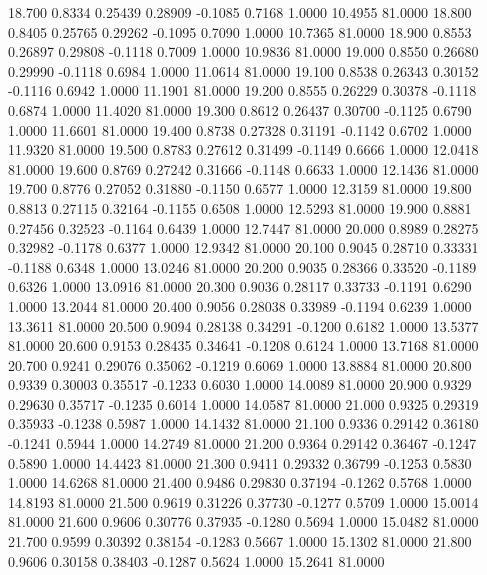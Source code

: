   18.700   0.8334   0.25439   0.28909  -0.1085   0.7168   1.0000  10.4955  81.0000
  18.800   0.8405   0.25765   0.29262  -0.1095   0.7090   1.0000  10.7365  81.0000
  18.900   0.8553   0.26897   0.29808  -0.1118   0.7009   1.0000  10.9836  81.0000
  19.000   0.8550   0.26680   0.29990  -0.1118   0.6984   1.0000  11.0614  81.0000
  19.100   0.8538   0.26343   0.30152  -0.1116   0.6942   1.0000  11.1901  81.0000
  19.200   0.8555   0.26229   0.30378  -0.1118   0.6874   1.0000  11.4020  81.0000
  19.300   0.8612   0.26437   0.30700  -0.1125   0.6790   1.0000  11.6601  81.0000
  19.400   0.8738   0.27328   0.31191  -0.1142   0.6702   1.0000  11.9320  81.0000
  19.500   0.8783   0.27612   0.31499  -0.1149   0.6666   1.0000  12.0418  81.0000
  19.600   0.8769   0.27242   0.31666  -0.1148   0.6633   1.0000  12.1436  81.0000
  19.700   0.8776   0.27052   0.31880  -0.1150   0.6577   1.0000  12.3159  81.0000
  19.800   0.8813   0.27115   0.32164  -0.1155   0.6508   1.0000  12.5293  81.0000
  19.900   0.8881   0.27456   0.32523  -0.1164   0.6439   1.0000  12.7447  81.0000
  20.000   0.8989   0.28275   0.32982  -0.1178   0.6377   1.0000  12.9342  81.0000
  20.100   0.9045   0.28710   0.33331  -0.1188   0.6348   1.0000  13.0246  81.0000
  20.200   0.9035   0.28366   0.33520  -0.1189   0.6326   1.0000  13.0916  81.0000
  20.300   0.9036   0.28117   0.33733  -0.1191   0.6290   1.0000  13.2044  81.0000
  20.400   0.9056   0.28038   0.33989  -0.1194   0.6239   1.0000  13.3611  81.0000
  20.500   0.9094   0.28138   0.34291  -0.1200   0.6182   1.0000  13.5377  81.0000
  20.600   0.9153   0.28435   0.34641  -0.1208   0.6124   1.0000  13.7168  81.0000
  20.700   0.9241   0.29076   0.35062  -0.1219   0.6069   1.0000  13.8884  81.0000
  20.800   0.9339   0.30003   0.35517  -0.1233   0.6030   1.0000  14.0089  81.0000
  20.900   0.9329   0.29630   0.35717  -0.1235   0.6014   1.0000  14.0587  81.0000
  21.000   0.9325   0.29319   0.35933  -0.1238   0.5987   1.0000  14.1432  81.0000
  21.100   0.9336   0.29142   0.36180  -0.1241   0.5944   1.0000  14.2749  81.0000
  21.200   0.9364   0.29142   0.36467  -0.1247   0.5890   1.0000  14.4423  81.0000
  21.300   0.9411   0.29332   0.36799  -0.1253   0.5830   1.0000  14.6268  81.0000
  21.400   0.9486   0.29830   0.37194  -0.1262   0.5768   1.0000  14.8193  81.0000
  21.500   0.9619   0.31226   0.37730  -0.1277   0.5709   1.0000  15.0014  81.0000
  21.600   0.9606   0.30776   0.37935  -0.1280   0.5694   1.0000  15.0482  81.0000
  21.700   0.9599   0.30392   0.38154  -0.1283   0.5667   1.0000  15.1302  81.0000
  21.800   0.9606   0.30158   0.38403  -0.1287   0.5624   1.0000  15.2641  81.0000
